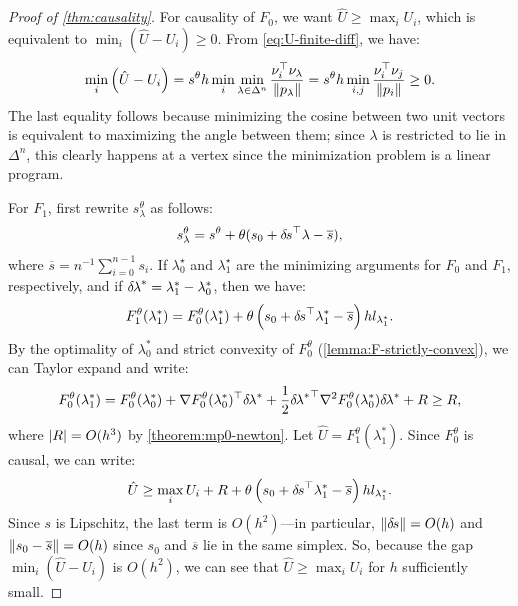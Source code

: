 \documentclass{article}
\begin{document}
\begin{proof}[Proof of \cref{thm:causality}]
  For causality of $F_0$, we want $\hat{U} \geq \max_i U_i$, which is
  equivalent to $\min_i(\hat{U} - U_i) \geq 0$. From
  \cref{eq:U-finite-diff}, we have:
  \begin{equation}
    \min_i \left(\hat{U} - U_i\right) = s^\theta h \min_i \min_{\lambda \in \Delta^n} \frac{\nu_i^\top \nu_{\lambda}}{\left\|p_\lambda\right\|} = s^\theta h \min_{i, j} \frac{\nu_i^\top \nu_j}{\left\|p_i\right\|} \geq 0.
  \end{equation}
  The last equality follows because minimizing the cosine between two
  unit vectors is equivalent to maximizing the angle between them;
  since $\lambda$ is restricted to lie in $\Delta^n$, this clearly
  happens at a vertex since the minimization problem is a linear
  program.

  For $F_1$, first rewrite $s_\lambda^\theta$ as follows:
  \begin{equation}
    s_\lambda^\theta = s^\theta + \theta (s_0 + {\delta \hspace{-0.1em} s}^\top \lambda - \overline{s}),
  \end{equation}
  where $\overline{s} = n^{-1} \sum_{i=0}^{n-1} s_i$. If
  $\lambda_0^\star$ and $\lambda_1^\star$ are the minimizing arguments
  for $F_0$ and $F_1$, respectively, and if
  ${\delta \hspace{-0.1em} \lambda}^* = \lambda_1^* - \lambda_0^*$, then we have:
  \begin{equation}\label{eq:F1-in-terms-of-F0}
    F_1^\theta(\lambda_1^*) = F_0^\theta(\lambda_1^*) + \theta \left(s_0 + {\delta \hspace{-0.1em} s}^\top \lambda_1^* - \overline{s}\right) h l_{\lambda_1^\star}.
  \end{equation}
  By the optimality of $\lambda_0^*$ and strict convexity of
  $F_0^\theta$ (\cref{lemma:F-strictly-convex}), we can Taylor expand
  and write:
  \begin{equation}
    F_0^\theta(\lambda_1^*) = F_0^\theta(\lambda_0^*) + \nabla F_0^\theta(\lambda_0^*)^\top {\delta \hspace{-0.1em} \lambda}^* + \frac{1}{2} {{\delta \hspace{-0.1em} \lambda}^*}^\top \nabla^2 F_0^\theta(\lambda_0^*) {\delta \hspace{-0.1em} \lambda}^* + R \geq R,
  \end{equation}
  where $\left|R\right| = O(h^3)$ by \cref{theorem:mp0-newton}. Let
  $\hat{U} = F_1^\theta(\lambda_1^*)$. Since $F_0^\theta$ is causal,
  we can write:
  \begin{equation}
    \hat{U} \geq \max_i U_i + R + \theta \left(s_0 + {\delta \hspace{-0.1em} s}^\top \lambda_1^* - \overline{s}\right) h l_{\lambda_1^*}.
  \end{equation}
  Since $s$ is Lipschitz, the last term is $O(h^2)$---in particular,
  $\left\|{\delta \hspace{-0.1em} s}\right\| = O(h)$ and $\left\|s_0 - \overline{s}\right\| = O(h)$ since
  $s_0$ and $\overline{s}$ lie in the same simplex. So, because the
  gap $\min_i(\hat{U} - U_i)$ is $O(h^2)$, we can see that
  $\hat{U} \geq \max_i U_i$ for $h$ sufficiently small.
\end{proof}


{}
\end{document}
